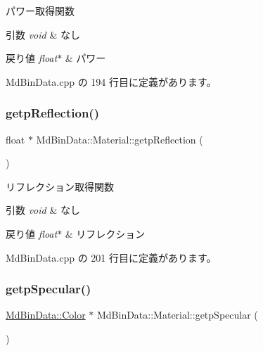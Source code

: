 パワー取得関数 


\begin{DoxyParams}{引数}
{\em void} & なし \\
\hline
\end{DoxyParams}

\begin{DoxyRetVals}{戻り値}
{\em float$\ast$} & パワー \\
\hline
\end{DoxyRetVals}


 Md\+Bin\+Data.\+cpp の 194 行目に定義があります。

\mbox{\label{class_md_bin_data_1_1_material_aa060a0f3fa72b5cfeef427c5a529e259}} 
\subsubsection{\texorpdfstring{getp\+Reflection()}{getpReflection()}}
{\footnotesize\ttfamily float $\ast$ Md\+Bin\+Data\+::\+Material\+::getp\+Reflection (\begin{DoxyParamCaption}{ }\end{DoxyParamCaption})}



リフレクション取得関数 


\begin{DoxyParams}{引数}
{\em void} & なし \\
\hline
\end{DoxyParams}

\begin{DoxyRetVals}{戻り値}
{\em float$\ast$} & リフレクション \\
\hline
\end{DoxyRetVals}


 Md\+Bin\+Data.\+cpp の 201 行目に定義があります。

\mbox{\label{class_md_bin_data_1_1_material_a3dd95902f709e30a346dbc095e0eb900}} 
\subsubsection{\texorpdfstring{getp\+Specular()}{getpSpecular()}}
{\footnotesize\ttfamily \mbox{\hyperlink{class_md_bin_data_1_1_color}{Md\+Bin\+Data\+::\+Color}} $\ast$ Md\+Bin\+Data\+::\+Material\+::getp\+Specular (\begin{DoxyParamCaption}{ }\end{DoxyParamCaption})}



